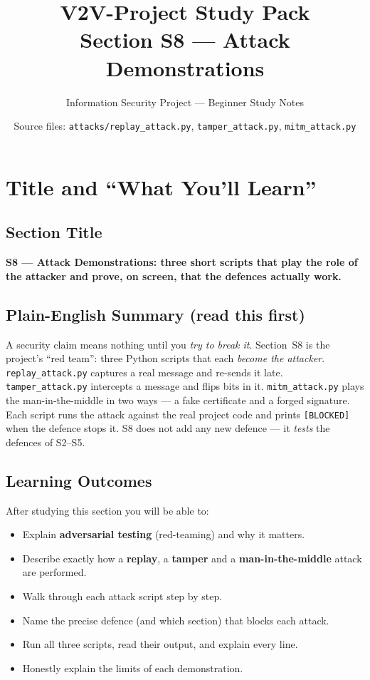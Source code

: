 \documentclass[11pt,a4paper]{article}
\title{\textbf{V2V-Project Study Pack}\\[4pt]
       \large Section S8 --- Attack Demonstrations}
\author{Information Security Project --- Beginner Study Notes}
\date{Source files: \texttt{attacks/replay\_attack.py}, \texttt{tamper\_attack.py}, \texttt{mitm\_attack.py}}
\begin{document}
\maketitle
\tableofcontents
\newpage

\section{Title and ``What You'll Learn''}

\subsection*{Section Title}
\textbf{S8 --- Attack Demonstrations: three short scripts that play the role of
the attacker and prove, on screen, that the defences actually work.}

\subsection*{Plain-English Summary (read this first)}
A security claim means nothing until you \emph{try to break it}. Section~S8 is
the project's ``red team'': three Python scripts that each \emph{become the
attacker}. \texttt{replay\_attack.py} captures a real message and re-sends it
late. \texttt{tamper\_attack.py} intercepts a message and flips bits in it.
\texttt{mitm\_attack.py} plays the man-in-the-middle in two ways --- a fake
certificate and a forged signature. Each script runs the attack against the real
project code and prints \texttt{[BLOCKED]} when the defence stops it. S8 does not
add any new defence --- it \emph{tests} the defences of S2--S5.

\subsection*{Learning Outcomes}
After studying this section you will be able to:
\begin{itemize}
  \item Explain \textbf{adversarial testing} (red-teaming) and why it matters.
  \item Describe exactly how a \textbf{replay}, a \textbf{tamper} and a
        \textbf{man-in-the-middle} attack are performed.
  \item Walk through each attack script step by step.
  \item Name the precise defence (and which section) that blocks each attack.
  \item Run all three scripts, read their output, and explain every line.
  \item Honestly explain the limits of each demonstration.
\end{itemize}
\end{document}
